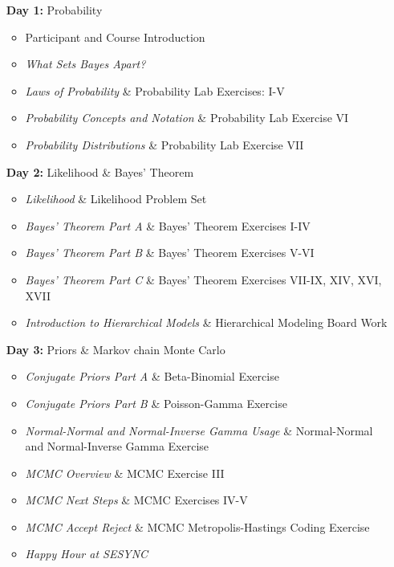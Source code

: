 \documentclass[11pt]{article}
\begin{document}
\begin{enumerate}
\item[\textbf{Day 1:}] Probability

\begin{itemize}
\item Participant and Course Introduction %
\item \emph{What Sets Bayes Apart?} %
\item \emph{Laws of Probability} \& Probability Lab Exercises: I-V %
\item \emph{Probability Concepts and Notation} \& Probability Lab Exercise VI %
\item \emph{Probability Distributions}  \& Probability Lab Exercise VII %
\end{itemize}

\item[\textbf{Day 2:}] Likelihood \& Bayes' Theorem

\begin{itemize}
\item \emph{Likelihood} \& Likelihood Problem Set %
\item \emph{Bayes' Theorem Part A} \& Bayes' Theorem Exercises I-IV %
\item \emph{Bayes' Theorem Part B} \& Bayes' Theorem Exercises  V-VI %
\item \emph{Bayes' Theorem Part C} \& Bayes' Theorem Exercises VII-IX, XIV, XVI, XVII %
\item \emph{Introduction to Hierarchical Models} \& Hierarchical Modeling Board Work %
\end{itemize}


\item[\textbf{Day 3:}] Priors \& Markov chain Monte Carlo

\begin{itemize}
\item \emph{Conjugate Priors Part A} \& Beta-Binomial Exercise %
\item \emph{Conjugate Priors Part B} \& Poisson-Gamma Exercise %
\item \emph{Normal-Normal and Normal-Inverse Gamma Usage} \& Normal-Normal and Normal-Inverse Gamma Exercise %
\item \emph{MCMC Overview} \& MCMC Exercise III %
\item \emph{MCMC Next Steps} \& MCMC Exercises IV-V %
\item \emph{MCMC Accept Reject} \& MCMC Metropolis-Hastings Coding Exercise  %
\item \emph{Happy Hour at SESYNC} 
\end{itemize}


\end{enumerate}
\end{document}
